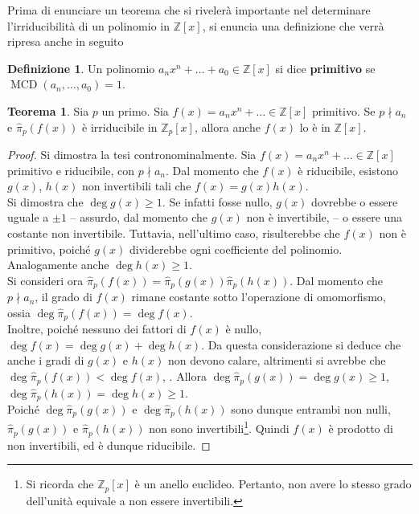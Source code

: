 \documentclass[a4paper]{article}
\newcommand{\ZZ}{\mathbb{Z}}
\newcommand{\ZZpx}{\mathbb{Z}_p[x]}
\newcommand{\ZZx}{\mathbb{Z}[x]}
\newcommand{\hatpip}{\hat{\pi}_p}
\theoremstyle{definition}
\newtheorem{definition}{Definizione}[section]
\newtheorem{theorem}{Teorema}[section]
\DeclareMathOperator{\MCD}{MCD}
\begin{document}
Prima di enunciare un teorema che si rivelerà
importante nel determinare l'irriducibilità di un
polinomio in $\ZZx$, si enuncia una definizione che
verrà ripresa anche in seguito

\begin{definition}
    Un polinomio $a_n x^n + \ldots + a_0 \in \ZZx$ si dice
    \textbf{primitivo} se $\MCD(a_n, \ldots, a_0)=1$.
\end{definition}

\begin{theorem}
    \label{th:proiezione_irriducibilità}
    Sia $p$ un primo. Sia $f(x) = a_n x^n + \ldots \in \ZZx$
    primitivo. Se $p \nmid a_n$ e
    $\hatpip(f(x))$ è irriducibile in $\ZZpx$, allora anche $f(x)$ lo
    è in $\ZZx$.
\end{theorem}

\begin{proof}
    Si dimostra la tesi contronominalmente. Sia $f(x) =
        a_nx^n + \ldots \in \ZZ[x]$ primitivo e riducibile, con
    $p \nmid a_n$. Dal momento che $f(x)$ è riducibile, esistono
    $g(x)$, $h(x)$ non invertibili tali che $f(x)=g(x)h(x)$. \\

    Si dimostra che $\deg g(x) \geq 1$. Se infatti fosse nullo,
    $g(x)$ dovrebbe o essere uguale a $\pm 1$ -- assurdo, dal
    momento che $g(x)$ non è invertibile, \Lightning{} -- o
    essere una costante non invertibile. Tuttavia, nell'ultimo
    caso, risulterebbe che $f(x)$ non è primitivo, poiché
    $g(x)$ dividerebbe ogni coefficiente del polinomio.
    Analogamente anche $\deg h(x) \geq 1$. \\

    Si consideri ora $\hatpip(f(x))=\hatpip(g(x))\hatpip(h(x))$.
    Dal momento che $p \nmid a_n$, il grado di $f(x)$ rimane costante
    sotto l'operazione di omomorfismo, ossia $\deg \hatpip(f(x)) =
        \deg f(x)$. \\

    Inoltre, poiché nessuno dei fattori di $f(x)$ è nullo, $\deg f(x) = \deg g(x) +
        \deg h(x)$. Da questa considerazione si deduce che anche i
    gradi di $g(x)$ e $h(x)$ non devono calare, altrimenti si
    avrebbe che $\deg \hatpip(f(x)) < \deg f(x)$, \Lightning{}.
    Allora $\deg \hatpip(g(x)) = \deg g(x) \geq 1$,
    $\deg \hatpip(h(x)) = \deg h(x) \geq 1$. \\

    Poiché $\deg \hatpip(g(x))$ e $\deg \hatpip(h(x))$ sono
    dunque entrambi non nulli, $\hatpip(g(x))$ e $\hatpip(h(x))$
    non sono invertibili\footnote{Si ricorda che $\ZZpx$
        è un anello euclideo. Pertanto, non avere lo stesso grado
        dell'unità equivale a non essere invertibili.}. Quindi
    $f(x)$ è prodotto di non invertibili, ed è dunque riducibile.

\end{proof}
\end{document}
